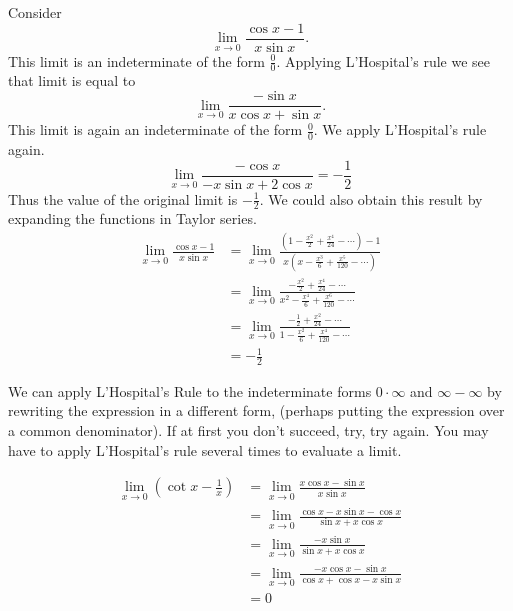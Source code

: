 \begin{example}
{\rm
Consider
  \[
  \lim_{x \to 0} \frac{\cos x - 1}{x \sin x}.
  \]
  This limit is an indeterminate of the form $\frac{0}{0}$.  Applying
  L'Hospital's rule we see that limit is equal to
  \[
  \lim_{x \to 0} \frac{-\sin x}{x \cos x + \sin x}.
  \]
  This limit is again an indeterminate of the form $\frac{0}{0}$.  We apply
  L'Hospital's rule again.
  \[
  \lim_{x \to 0} \frac{- \cos x}{ - x \sin x + 2 \cos x } = - \frac{1}{2}
  \]
  Thus the value of the original limit is $- \frac{1}{2}$.  We could also
  obtain this result by expanding the functions in Taylor series.
  \begin{align*}
    \lim_{x \to 0} \frac{\cos x - 1}{x \sin x}
    &= \lim_{x \to 0} \frac{\left( 1 - \frac{x^2}{2} + \frac{x^4}{24} 
        - \cdots \right) - 1 }{ x \left( x - \frac{x^3}{6} 
        + \frac{x^5}{120} - \cdots \right)} \\
    &= \lim_{x \to 0} \frac{- \frac{x^2}{2} + \frac{x^4}{24} - \cdots }
    { x^2 - \frac{x^4}{6} + \frac{x^6}{120} - \cdots } \\
    &= \lim_{x \to 0} \frac{- \frac{1}{2} + \frac{x^2}{24} - \cdots }
    { 1 - \frac{x^2}{6} + \frac{x^4}{120} - \cdots } \\
    &= - \frac{1}{2}
  \end{align*}
}
\end{example}




We can apply L'Hospital's Rule to the indeterminate forms $0 \cdot \infty$
and $\infty - \infty$ by rewriting the expression in a different form, 
(perhaps putting the expression over a common denominator).  If at first
you don't succeed, try, try again.  You may have to apply L'Hospital's 
rule several times to evaluate a limit.


\begin{example}
  \begin{align*}
    \lim_{x \to 0} \left( \cot x - \frac{1}{x} \right)
    &= \lim_{x \to 0} \frac{x \cos x - \sin x}{x \sin x} \\
    &= \lim_{x \to 0} \frac{\cos x - x \sin x - \cos x}
    {\sin x + x \cos x} \\
    &= \lim_{x \to 0} \frac{- x \sin x } {\sin x + x \cos x} \\
    &= \lim_{x \to 0} \frac{- x \cos x - \sin x } 
    {\cos x + \cos x - x \sin x } \\
    &= 0
  \end{align*}
\end{example}


